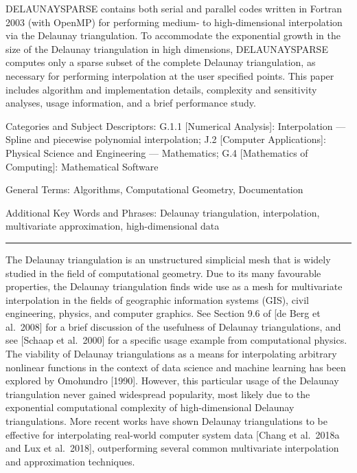{\rmVIII\parindent=0pt DELAUNAYSPARSE contains both serial and
parallel codes written in Fortran 2003 (with OpenMP) for performing
medium- to high-dimensional interpolation via the Delaunay triangulation.
To accommodate the exponential growth in the size of the Delaunay
triangulation in high dimensions, DELAUNAYSPARSE computes only a
sparse subset of the complete Delaunay triangulation, as necessary for
performing interpolation at the user specified points. This paper includes
algorithm and implementation details, complexity and sensitivity analyses,
usage information, and a brief performance study.

\medskip
Categories and Subject Descriptors: G.1.1 [{\bfVIII Numerical Analysis}]:
Interpolation --- Spline and piecewise polynomial interpolation;
J.2 [{\bfVIII Computer Applications}]: Physical Science and Engineering
--- {\itVIII Mathematics};
G.4 [{\bfVIII Mathematics of Computing}]: Mathematical Software

\medskip
General Terms: Algorithms, Computational Geometry, Documentation

\medskip
Additional Key Words and Phrases: Delaunay triangulation, interpolation,
multivariate approximation, high-dimensional data

}
\bigskip\hrule\bigskip\medskip
{}

The Delaunay triangulation is an unstructured simplicial mesh that
is widely studied in the field of computational geometry. Due to its
many favourable properties, the Delaunay triangulation finds wide use
as a mesh for multivariate interpolation in the fields of geographic
information systems (GIS), civil engineering, physics, and computer
graphics. See Section 9.6 of [de Berg et al.\ 2008] for a brief
discussion of the usefulness of Delaunay triangulations, and see
[Schaap et al.\ 2000] for a specific usage example from computational
physics. The viability of Delaunay triangulations as a means for
interpolating arbitrary nonlinear functions in the context of data science
and machine learning has been explored by Omohundro [1990]. However,
this particular usage of the Delaunay triangulation never gained
widespread popularity, most likely due to the exponential computational
complexity of high-dimensional Delaunay triangulations. More recent
works have shown Delaunay triangulations to be effective for
interpolating real-world computer system data [Chang et al.\ 2018a 
and Lux et al.\ 2018], outperforming several common multivariate
interpolation and approximation techniques.

